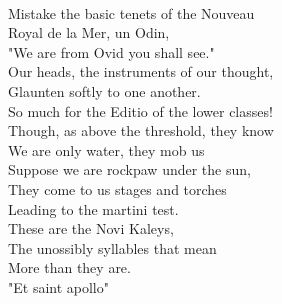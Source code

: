 \documentclass[smalldemyvopaper,11pt,twoside,onecolumn,openright,extrafontsizes]{memoir}
\begin{document}
\\Mistake the basic tenets of the Nouveau
\\Royal de la Mer, un Odin,
\\"We are from Ovid you shall see."
\\Our heads, the instruments of our thought,
\\Glaunten softly to one another.
\\So much for the Editio of the lower classes!
\\Though, as above the threshold, they know
\\We are only water, they mob us
\\Suppose we are rockpaw under the sun,
\\They come to us stages and torches
\\Leading to the martini test.
\\These are the Novi Kaleys,
\\The unossibly syllables that mean
\\More than they are.
\\"Et saint apollo"
\end{document}
